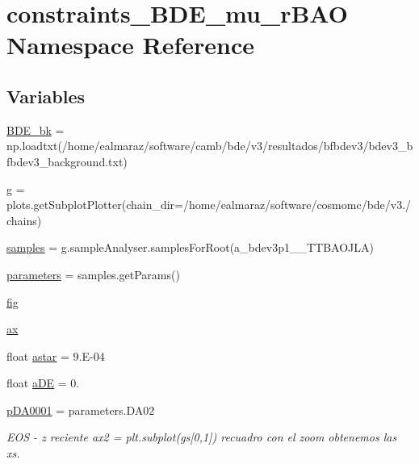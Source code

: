 \hypertarget{namespaceconstraints__BDE__mu__rBAO}{}\section{constraints\+\_\+\+B\+D\+E\+\_\+mu\+\_\+r\+B\+AO Namespace Reference}
\label{namespaceconstraints__BDE__mu__rBAO}
\subsection*{Variables}
\begin{DoxyCompactItemize}
\item 
\mbox{\hyperlink{namespaceconstraints__BDE__mu__rBAO_a01151f20a73e7c4142d84df9cc7fc3da}{B\+D\+E\+\_\+bk}} = np.\+loadtxt(\textquotesingle{}/home/ealmaraz/software/camb/bde/v3/resultados/bfbdev3/bdev3\+\_\+bfbdev3\+\_\+background.\+txt\textquotesingle{})
\item 
\mbox{\hyperlink{namespaceconstraints__BDE__mu__rBAO_a6ade3eaa62ea3b0f6f061521492247a6}{g}} = plots.\+get\+Subplot\+Plotter(chain\+\_\+dir=\textquotesingle{}/home/ealmaraz/software/cosmomc/bde/v3./chains\textquotesingle{})
\item 
\mbox{\hyperlink{namespaceconstraints__BDE__mu__rBAO_a98143a8e64460a63985c59e07453e30f}{samples}} = g.\+sample\+Analyser.\+samples\+For\+Root(\textquotesingle{}a\+\_\+bdev3p1\+\_\+\_\+\+T\+T\+B\+A\+O\+J\+LA\textquotesingle{})
\item 
\mbox{\hyperlink{namespaceconstraints__BDE__mu__rBAO_a9d4bfa3cf42d8fe57906e6f3a4b41faa}{parameters}} = samples.\+get\+Params()
\item 
\mbox{\hyperlink{namespaceconstraints__BDE__mu__rBAO_a41fde85502da953c10375681e6204867}{fig}}
\item 
\mbox{\hyperlink{namespaceconstraints__BDE__mu__rBAO_a369a0cdde4fa5b7898894a60e4383eec}{ax}}
\item 
float \mbox{\hyperlink{namespaceconstraints__BDE__mu__rBAO_ae5442eb909c026425020d58554d2313e}{astar}} = 9.\+E-\/04
\item 
float \mbox{\hyperlink{namespaceconstraints__BDE__mu__rBAO_abb8115fc92777b302cf81b2cf8a3cae3}{a\+DE}} = 0.
\item 
\mbox{\hyperlink{namespaceconstraints__BDE__mu__rBAO_a5fb9b187a8cb4255d88cc7735adc35d0}{p\+D\+A0001}} = parameters.\+D\+A02
\begin{DoxyCompactList}\small\item\em E\+OS -\/ z reciente ax2 = plt.\+subplot(gs\mbox{[}0,1\mbox{]}) recuadro con el zoom obtenemos las x\textquotesingle{}s. \end{DoxyCompactList}\item 

\end{DoxyCompactItemize}
